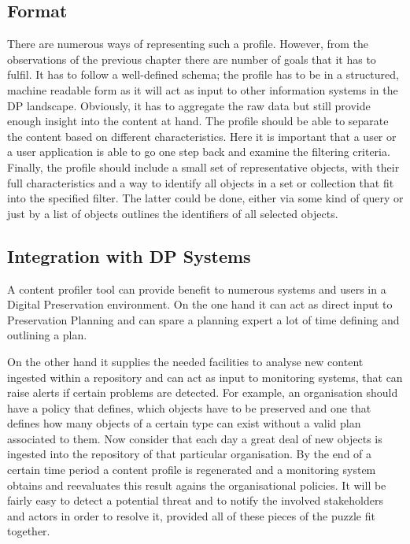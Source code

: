 \subsection{Format}
There are numerous ways of representing such a profile. However, from the observations of the previous chapter there are number of goals that it has to fulfil.
It has to follow a well-defined schema; the profile has to be in a structured, machine readable form as it will act as input to other information systems in the DP landscape.
Obviously, it has to aggregate the raw data but still provide enough insight into the content at hand. The profile should be able to separate the content based on different characteristics. Here it is important that a user or a user application is able to go one step back and examine the filtering criteria. Finally, the profile should include a small set of representative objects, with their full characteristics and a way to identify all objects in a set or collection that fit into the specified filter. The latter could be done, either via some kind of query or just by a list of objects outlines the identifiers of all selected objects.

\subsection{Integration with DP Systems}
A content profiler tool can provide benefit to numerous systems and users in a Digital Preservation environment. On the one hand it can act as direct input to Preservation Planning and can spare a planning expert a lot of time defining and outlining a plan. 

On the other hand it supplies the needed facilities to analyse new content ingested within a repository and can act as input to monitoring systems, that can raise alerts if certain problems are detected. For example, an organisation should have a policy that defines, which objects have to be preserved and one that defines how many objects of a certain type can exist without a valid plan associated to them. Now consider that each day a great deal of new objects is ingested into the repository of that particular organisation. By the end of a certain time period a content profile is regenerated and a monitoring system obtains and reevaluates this result agains the organisational policies. It will be fairly easy to detect a potential threat and to notify the involved stakeholders and actors in order to resolve it, provided all of these pieces of the puzzle fit together.

